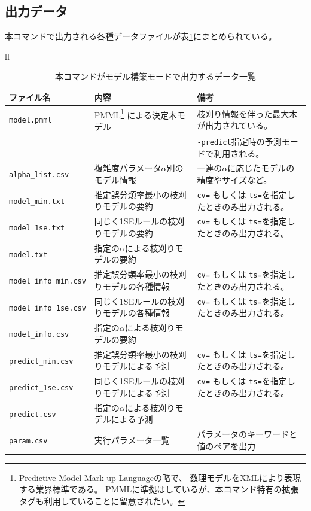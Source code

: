 \subsection{出力データ}
本コマンドで出力される各種データファイルが表\ref{tbl:mbonsai_out}にまとめられている。

\begin{table}[htbp]
\begin{center}
\begin{tabular}{ll}

\begin{minipage}{1.0\hsize}
\begin{center}
\caption{本コマンドがモデル構築モードで出力するデータ一覧\label{tbl:mbonsai_out}}
{\small
\begin{tabular}{lll}
\hline
ファイル名&内容&備考\\
\hline
\verb|model.pmml|       & PMML\footnote{
Predictive Model Mark-up Languageの略で、
数理モデルをXMLにより表現する業界標準である。
PMMLに準拠はしているが、本コマンド特有の拡張タグも利用していることに留意されたい。
}
による決定木モデル                                                   & 枝刈り情報を伴った最大木が出力されている。\\
                          &                                          & \verb|-predict|指定時の予測モードで利用される。 \\
\verb|alpha_list.csv|     & 複雑度パラメータ$\alpha$別のモデル情報   & 一連の$\alpha$に応じたモデルの精度やサイズなど。 \\
\verb|model_min.txt|      & 推定誤分類率最小の枝刈りモデルの要約     & \verb|cv=| もしくは \verb|ts=|を指定したときのみ出力される。 \\
\verb|model_1se.txt|      & 同じく1SEルールの枝刈りモデルの要約      & \verb|cv=| もしくは \verb|ts=|を指定したときのみ出力される。 \\
\verb|model.txt|          & 指定の$\alpha$による枝刈りモデルの要約   & \\
\verb|model_info_min.csv| & 推定誤分類率最小の枝刈りモデルの各種情報 & \verb|cv=| もしくは \verb|ts=|を指定したときのみ出力される。  \\
\verb|model_info_1se.csv| & 同じく1SEルールの枝刈りモデルの各種情報  & \verb|cv=| もしくは \verb|ts=|を指定したときのみ出力される。  \\
\verb|model_info.csv|     & 指定の$\alpha$による枝刈りモデルの要約   & \\
\verb|predict_min.csv|    & 推定誤分類率最小の枝刈りモデルによる予測 & \verb|cv=| もしくは \verb|ts=|を指定したときのみ出力される。  \\
\verb|predict_1se.csv|    & 同じく1SEルールの枝刈りモデルによる予測  & \verb|cv=| もしくは \verb|ts=|を指定したときのみ出力される。  \\
\verb|predict.csv|        & 指定の$\alpha$による枝刈りモデルによる予測 & \\
\verb|param.csv|          & 実行パラメータ一覧                       & パラメータのキーワードと値のペアを出力 \\
\hline
\end{tabular} 
}
\end{center}
\end{minipage}


\end{tabular}
\end{center}
\end{table}
